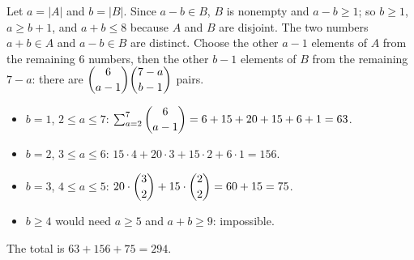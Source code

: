 Let $a=|A|$ and $b=|B|$. Since $a-b\in B$, $B$ is nonempty and $a-b\ge1$; so $b\ge1$, $a\ge b+1$, and $a+b\le8$ because $A$ and $B$ are disjoint. The two numbers $a+b\in A$ and $a-b\in B$ are distinct. Choose the other $a-1$ elements of $A$ from the remaining $6$ numbers, then the other $b-1$ elements of $B$ from the remaining $7-a$: there are $\dbinom{6}{a-1}\dbinom{7-a}{b-1}$ pairs.
\begin{itemize}
\item $b=1$, $2\le a\le7$: $\sum_{a=2}^{7}\dbinom6{a-1}=6+15+20+15+6+1=63$.
\item $b=2$, $3\le a\le6$: $15\cdot4+20\cdot3+15\cdot2+6\cdot1=156$.
\item $b=3$, $4\le a\le5$: $20\cdot\dbinom32+15\cdot\dbinom22=60+15=75$.
\item $b\ge4$ would need $a\ge5$ and $a+b\ge9$: impossible.
\end{itemize}
The total is $63+156+75=\boxed{294}$.

